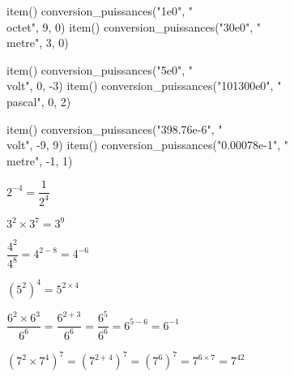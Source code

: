 \documentclass[../Cours.tex]{subfiles}
\begin{document}
\color{bleu}

\begin{listedexemples}
    \small
    \item[] 
    \begin{luacode}
        item() conversion_puissances("1e0", "\\octet", 9, 0)
        item() conversion_puissances("30e0", "\\metre", 3, 0)
    \end{luacode}
    \clearpage
    \item[] 
    \begin{luacode}
        item() conversion_puissances("5e0", "\\volt", 0, -3)
        item() conversion_puissances("101300e0", "\\pascal", 0, 2)
    \end{luacode}
    \item[] 
    \begin{luacode}
        item() conversion_puissances("398.76e-6", "\\volt", -9, 9)
        item() conversion_puissances("0.00078e-1", "\\metre", -1, 1)
    \end{luacode}
\end{listedexemples}

\clearpage
{}




\begin{listedexemples}
    \item $2^{-4} = \dfrac{1}{2^4}$
    \item $3^2 \times 3^7 = 3^9$
    \item $\dfrac{4^2}{4^8} = 4^{2-8} = 4^{-6}$
    \item $\left(5^2\right)^4 = 5^{2 \times 4} $
    \item $\dfrac{6^2 \times 6^3}{6^6} = \dfrac{6^{2+3}}{6^6} = \dfrac{6^5}{6^6} = 6^{5-6} = 6^{-1}$
    \item $\left( 7^2 \times 7^4 \right)^7 = \left(7^{2+4}\right)^7 = \left(7^6\right)^7 = 7^{6 \times 7} = 7^{42}$
\end{listedexemples}
\end{document}
